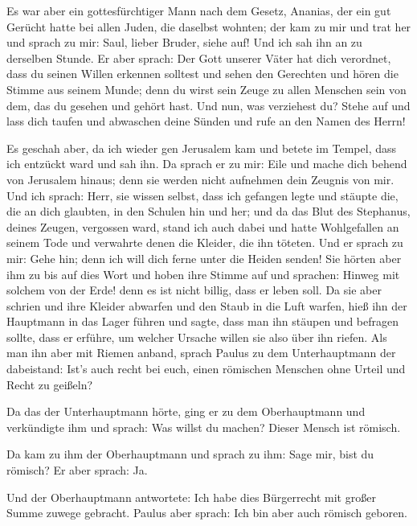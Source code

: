  Es war aber ein gottesfürchtiger Mann nach dem Gesetz,
Ananias, der ein gut Gerücht hatte bei allen Juden, die daselbst
wohnten;  der kam zu mir und trat her und sprach zu mir:
Saul, lieber Bruder, siehe auf! Und ich sah ihn an zu derselben Stunde.
 Er aber sprach: Der Gott unserer Väter hat dich
verordnet, dass du seinen Willen erkennen solltest und sehen den
Gerechten und hören die Stimme aus seinem Munde;  denn du
wirst sein Zeuge zu allen Menschen sein von dem, das du gesehen und
gehört hast.  Und nun, was verziehest du? Stehe auf und
lass dich taufen und abwaschen deine Sünden und rufe an den Namen des
Herrn!

 Es geschah aber, da ich wieder gen Jerusalem kam und
betete im Tempel, dass ich entzückt ward und sah ihn.  Da
sprach er zu mir: Eile und mache dich behend von Jerusalem hinaus; denn
sie werden nicht aufnehmen dein Zeugnis von mir.  Und ich
sprach: Herr, sie wissen selbst, dass ich gefangen legte und stäupte
die, die an dich glaubten, in den Schulen hin und her; 
und da das Blut des Stephanus, deines Zeugen, vergossen ward, stand ich
auch dabei und hatte Wohlgefallen an seinem Tode und verwahrte denen die
Kleider, die ihn töteten.  Und er sprach zu mir: Gehe
hin; denn ich will dich ferne unter die Heiden senden! 
Sie hörten aber ihm zu bis auf dies Wort und hoben ihre Stimme auf und
sprachen: Hinweg mit solchem von der Erde! denn es ist nicht billig,
dass er leben soll.  Da sie aber schrien und ihre Kleider
abwarfen und den Staub in die Luft warfen,  hieß ihn der
Hauptmann in das Lager führen und sagte, dass man ihn stäupen und
befragen sollte, dass er erführe, um welcher Ursache willen sie also
über ihn riefen.  Als man ihn aber mit Riemen anband,
sprach Paulus zu dem Unterhauptmann der dabeistand: Ist's auch recht bei
euch, einen römischen Menschen ohne Urteil und Recht zu geißeln?

 Da das der Unterhauptmann hörte, ging er zu dem
Oberhauptmann und verkündigte ihm und sprach: Was willst du machen?
Dieser Mensch ist römisch.

 Da kam zu ihm der Oberhauptmann und sprach zu ihm: Sage
mir, bist du römisch? Er aber sprach: Ja.

 Und der Oberhauptmann antwortete: Ich habe dies
Bürgerrecht mit großer Summe zuwege gebracht. Paulus aber sprach: Ich
bin aber auch römisch geboren.

